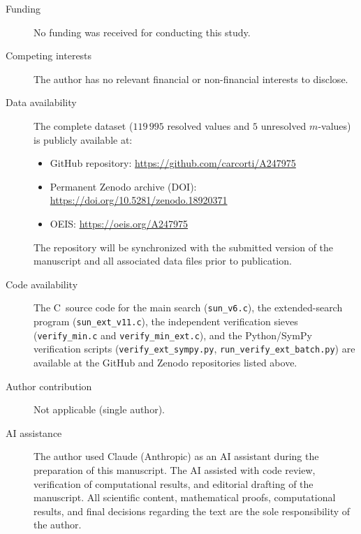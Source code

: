 \documentclass[pdflatex,sn-mathphys-num,Numbered]{sn-jnl}
\theoremstyle{thmstyleone}
\theoremstyle{thmstylethree}
\theoremstyle{thmstyletwo}
\numberwithin{equation}{section}
\begin{document}
\begin{description}
\item[Funding] No funding was received for conducting this study.

\item[Competing interests] The author has no relevant financial
  or non-financial interests to disclose.

\item[Data availability] \label{sec:data}
  The complete dataset ($119\,995$ resolved values and $5$ unresolved
  $m$-values) is publicly available at:
  \begin{itemize}
    \item GitHub repository:
          \url{https://github.com/carcorti/A247975}
    \item Permanent Zenodo archive (DOI):\\
          \url{https://doi.org/10.5281/zenodo.18920371}
    \item OEIS: \url{https://oeis.org/A247975}
  \end{itemize}
  The repository will be synchronized with the submitted version of the
  manuscript and all associated data files prior to publication.

\item[Code availability]
  The C~source code for the main search
  (\texttt{sun\_v6.c}), the extended-search program
  (\texttt{sun\_ext\_v11.c}), the independent verification sieves
  (\texttt{verify\_min.c} and \texttt{verify\_min\_ext.c}), and the
  Python/SymPy verification scripts
  (\texttt{verify\_ext\_sympy.py}, \texttt{run\_verify\_ext\_batch.py})
  are available at the GitHub and Zenodo repositories listed above.

\item[Author contribution] Not applicable (single author).

\item[AI assistance]
The author used Claude (Anthropic) as an AI assistant during the preparation of this manuscript. The AI assisted with code review, verification of computational results, and editorial drafting of the manuscript. All scientific content, mathematical proofs, computational results, and final decisions regarding the text are the sole responsibility of the author.
\end{description}
\end{document}
